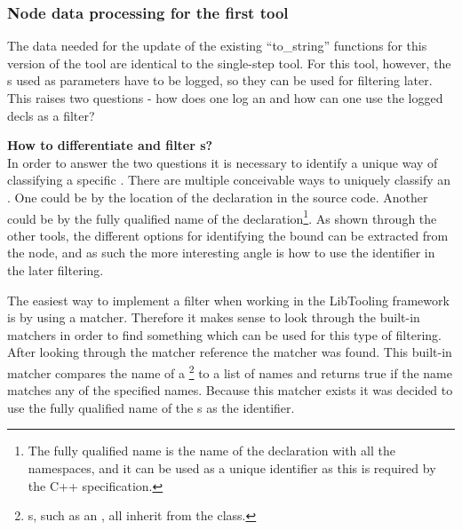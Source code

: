 \subsubsection*{Node data processing for the first tool}

The data needed for the update of the existing ``to\_string'' functions for this version of the tool are identical to the single-step tool. For this tool, however, the s used as parameters have to be logged, so they can be used for filtering later. This raises two questions - how does one log an  and how can one use the logged decls as a filter?

\textbf{How to differentiate and filter s?}\\\label{text:080dev:085example:060enum:tool1:how_to_diff}In order to answer the two questions it is necessary to identify a unique way of classifying a specific . There are multiple conceivable ways to uniquely classify an . One could be by the location of the declaration in the source code. Another could be by the fully qualified name of the declaration\footnote{The fully qualified name is the name of the declaration with all the namespaces, and it can be used as a unique identifier as this is required by the C++ specification.}. As shown through the other tools, the different options for identifying the bound  can be extracted from the node, and as such the more interesting angle is how to use the identifier in the later filtering.

The easiest way to implement a filter when working in the LibTooling framework is by using a matcher. Therefore it makes sense to look through the built-in matchers in order to find something which can be used for this type of filtering. After looking through the matcher reference the  matcher was found. This built-in matcher compares the name of a \footnote{s, such as an , all inherit from the  class.} to a list of names and returns true if the name matches any of the specified names. Because this matcher exists it was decided to use the fully qualified name of the s as the identifier.

